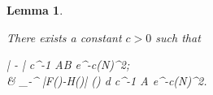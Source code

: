 \documentclass{amsart}
\numberwithin{equation}{section}
\newtheorem{lem}[thm]{Lemma}
\theoremstyle{remark}
\theoremstyle{definition}
\begin{document}
	\begin{lem}
		
		\label{fhlambda}
		
		There exists a constant $c>0$ such that 
		\begin{flalign}
			\label{fhlambda2} 
			\begin{aligned} 
			\Bigg|  \bigg[ \displaystyle\sum_{i=N_1}^{N_2} F(\Lambda_i) \cdot G(& q_i - q_j) \bigg] -  \bigg[ \displaystyle\sum_{i=N_1}^{N_2} H(\Lambda_i) \cdot G(q_i - q_j) \bigg] \Bigg| \le c^{-1} AB e^{-c(\log N)^2}; \\
			& \displaystyle\int_{-\infty}^{\infty} |F(\lambda)-H(\lambda)| \varrho (\lambda) d \lambda \le c^{-1} A e^{-c(\log N)^2}.
			\end{aligned} 
		\end{flalign}
		
	\end{lem} 
	
\end{document}
